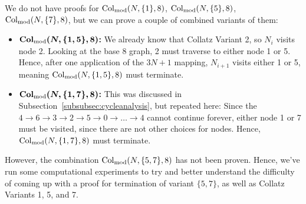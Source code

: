 We do not have proofs for $\mathrm{Col}_{\text{mod}}(N,\{1\},8)$, $\mathrm{Col}_{\text{mod}}(N,\{5\},8)$, $\mathrm{Col}_{\text{mod}}(N,\{7\},8)$, but we can prove a couple of combined variants of them:
\begin{itemize}
    \item \textbf{$\boldsymbol{\mathrm{Col}_{\text{mod}}(N,\{1,5\},8)}$:} We already know that Collatz Variant 2, so $N_i$ visits node 2. Looking at the base 8 graph, 2 must traverse to either node 1 or 5. Hence, after one application of the $3N+1$ mapping, $N_{i+1}$ visits either 1 or 5, meaning $\mathrm{Col}_{\text{mod}}(N,\{1,5\},8)$ must terminate.
    \item \textbf{$\boldsymbol{\mathrm{Col}_{\text{mod}}(N,\{1,7\},8)}$:} This was discussed in Subsection~\ref{subsubsec:cycleanalysis}, but repeated here: Since the $4 \rightarrow 6 \rightarrow 3 \rightarrow 2 \rightarrow 5 \rightarrow 0 \rightarrow \ldots \rightarrow 4$ cannot continue forever, either node 1 or 7 must be visited, since there are not other choices for nodes. Hence, $\mathrm{Col}_{\text{mod}}(N,\{1,7\},8)$ must terminate.
\end{itemize}
However, the combination $\mathrm{Col}_{\text{mod}}(N,\{5,7\},8)$ has not been proven. Hence, we've run some computational experiments to try and better understand the difficulty of coming up with a proof for termination of variant $\{5,7\}$, as well as Collatz Variants 1, 5, and 7.

